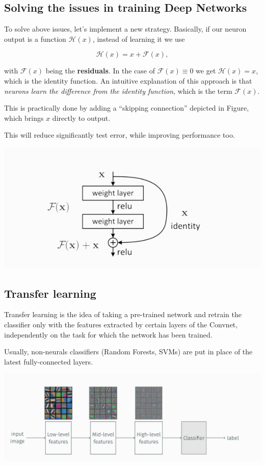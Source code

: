 \documentclass[10pt]{report}
\begin{document}
\subsection{Solving the issues in training Deep Networks}
\label{sec:org48a7042}
To solve above issues, let's implement a new strategy. Basically, if our
neuron output is a function \(\mathcal{H}(x)\), instead of learning it
we use

\[ \mathcal{H}(x) = x + \mathcal{F}(x),\]

with \(\mathcal{F}(x)\) being the \textbf{residuals}. In the case of
\(\mathcal{F}(x) \equiv 0\) we get \(\mathcal{H}(x) = x\), which is the
identity function. An intuitive explanation of this approach is that
\emph{neurons learn the difference from the identity function}, which is the
term \(\mathcal{F}(x)\).

This is practically done by adding a ``skipping connection'' depicted in
Figure, which brings \(x\) directly to output.

This will reduce significantly test error, while improving performance
too.

\begin{center}
\includegraphics[scale=0.3]{./pics/cnn/residuals.jpg}
\end{center}

\subsection{Transfer learning}
\label{sec:org6a4e1fd}
Transfer learning is the idea of taking a pre-trained network and
retrain the classifier only with the features extracted by certain
layers of the Convnet, independently on the task for which the network
has been trained.

Usually, non-neurals classifiers (Random Forests, SVMs) are put in place
of the latest fully-connected layers.

\begin{center}
\includegraphics[width=.9\linewidth]{./pics/cnn/transfer-learning.jpg}
\end{center}
\end{document}
